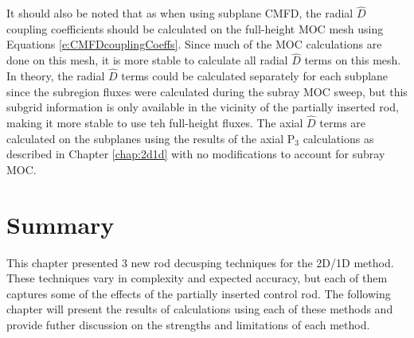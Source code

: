 It should also be noted that as when using subplane CMFD, the radial $\hat{D}$ coupling coefficients should be calculated on the full-height MOC mesh using Equations \ref{e:CMFDcouplingCoeffs}.  Since much of the MOC calculations are done on this mesh, it is more stable to calculate all radial $\hat{D}$ terms on this mesh.  In theory, the radial $\hat{D}$ terms could be calculated separately for each subplane since the subregion fluxes were calculated during the subray MOC sweep, but this subgrid information is only available in the vicinity of the partially inserted rod, making it more stable to use teh full-height fluxes.  The axial $\hat{D}$ terms are calculated on the subplanes using the results of the axial P$_3$ calculations as described in Chapter \ref{chap:2d1d} with no modifications to account for subray MOC.

\section{Summary}

This chapter presented 3 new rod decusping techniques for the 2D/1D method.  These techniques vary in complexity and expected accuracy, but each of them captures some of the effects of the partially inserted control rod.  The following chapter will present the results of calculations using each of these methods and provide futher discussion on the strengths and limitations of each method.